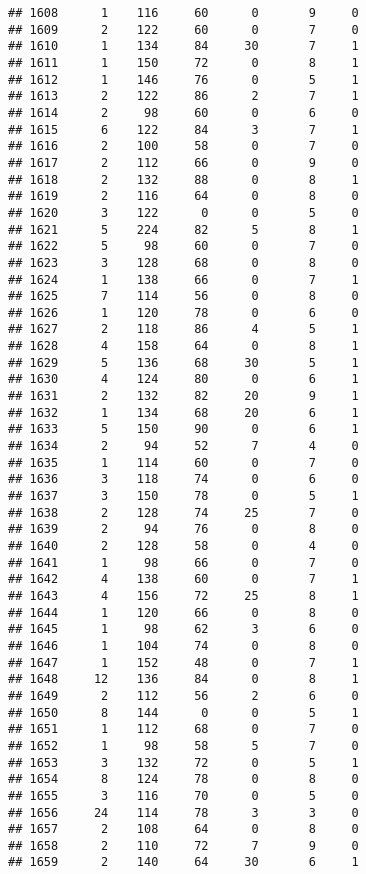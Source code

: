 \documentclass[
]{article}
\begin{document}
\begin{verbatim}
## 1608      1    116     60      0       9     0
## 1609      2    122     60      0       7     0
## 1610      1    134     84     30       7     1
## 1611      1    150     72      0       8     1
## 1612      1    146     76      0       5     1
## 1613      2    122     86      2       7     1
## 1614      2     98     60      0       6     0
## 1615      6    122     84      3       7     1
## 1616      2    100     58      0       7     0
## 1617      2    112     66      0       9     0
## 1618      2    132     88      0       8     1
## 1619      2    116     64      0       8     0
## 1620      3    122      0      0       5     0
## 1621      5    224     82      5       8     1
## 1622      5     98     60      0       7     0
## 1623      3    128     68      0       8     0
## 1624      1    138     66      0       7     1
## 1625      7    114     56      0       8     0
## 1626      1    120     78      0       6     0
## 1627      2    118     86      4       5     1
## 1628      4    158     64      0       8     1
## 1629      5    136     68     30       5     1
## 1630      4    124     80      0       6     1
## 1631      2    132     82     20       9     1
## 1632      1    134     68     20       6     1
## 1633      5    150     90      0       6     1
## 1634      2     94     52      7       4     0
## 1635      1    114     60      0       7     0
## 1636      3    118     74      0       6     0
## 1637      3    150     78      0       5     1
## 1638      2    128     74     25       7     0
## 1639      2     94     76      0       8     0
## 1640      2    128     58      0       4     0
## 1641      1     98     66      0       7     0
## 1642      4    138     60      0       7     1
## 1643      4    156     72     25       8     1
## 1644      1    120     66      0       8     0
## 1645      1     98     62      3       6     0
## 1646      1    104     74      0       8     0
## 1647      1    152     48      0       7     1
## 1648     12    136     84      0       8     1
## 1649      2    112     56      2       6     0
## 1650      8    144      0      0       5     1
## 1651      1    112     68      0       7     0
## 1652      1     98     58      5       7     0
## 1653      3    132     72      0       5     1
## 1654      8    124     78      0       8     0
## 1655      3    116     70      0       5     0
## 1656     24    114     78      3       3     0
## 1657      2    108     64      0       8     0
## 1658      2    110     72      7       9     0
## 1659      2    140     64     30       6     1

\end{verbatim}
\end{document}
